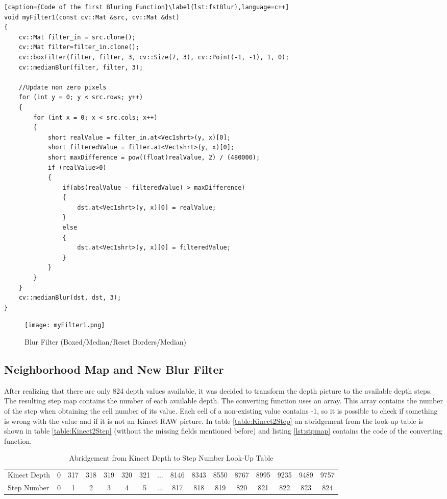 \begin{lstlisting}[caption={Code of the first Bluring Function}\label{lst:fstBlur},language=c++]
void myFilter1(const cv::Mat &src, cv::Mat &dst)
{
	cv::Mat filter_in = src.clone();
	cv::Mat filter=filter_in.clone();
	cv::boxFilter(filter, filter, 3, cv::Size(7, 3), cv::Point(-1, -1), 1, 0);
	cv::medianBlur(filter, filter, 3);
	
	//Update non zero pixels
	for (int y = 0; y < src.rows; y++)
	{
		for (int x = 0; x < src.cols; x++)
		{
			short realValue = filter_in.at<Vec1shrt>(y, x)[0];
			short filteredValue = filter.at<Vec1shrt>(y, x)[0];
			short maxDifference = pow((float)realValue, 2) / (480000);
			if (realValue>0)
			{
				if(abs(realValue - filteredValue) > maxDifference)
				{
					dst.at<Vec1shrt>(y, x)[0] = realValue;
				}
				else
				{
					dst.at<Vec1shrt>(y, x)[0] = filteredValue;
				}
			}
		}
	}
	cv::medianBlur(dst, dst, 3);
}
\end{lstlisting}

\begin{figure}[H]
\begin{center}
  \texttt{[image: myFilter1.png]}
  \caption{Blur Filter (Boxed/Median/Reset Borders/Median)}
  \label{figure:blur}
\end{center}
\end{figure}

\subsection{Neighborhood Map and New Blur Filter} \label{sect:blurFilter} 
After realizing that there are only 824 depth values available, it was decided to transform the depth picture
to the available depth steps. The resulting step map contains the number of each available depth. 
The converting function uses an array. This array contains the number of the
step when obtaining the cell number of its value. Each cell of a non-existing value contains -1, so it is
possible to check if something is wrong with the value and if it is not an Kinect RAW picture.
In table \vref{table:Kinect2Step} an abridgement from the look-up table is shown in table \vref{table:Kinect2Step}
(without the missing fields mentioned before) and listing \vref{lst:stpmap} contains the code of the converting function.


\begin{table}[H]
\centering
\tiny
\begin{tabular}{lccccccccccccccc}
Kinect Depth& 0 & 317 & 318 & 319 & 320 & 321 & ... & 8146 & 8343 & 8550 & 8767 & 8995 & 9235 & 9489 & 9757\\
Step Number & 0 &   1 &   2 &   3 &   4 &   5 & ... &   817 & 818 &  819 &  820 &  821 &  822 & 823  & 824\\
\end{tabular}
\caption{Abridgement from Kinect Depth to Step Number Look-Up Table }
\label{table:Kinect2Step}
\end{table}


